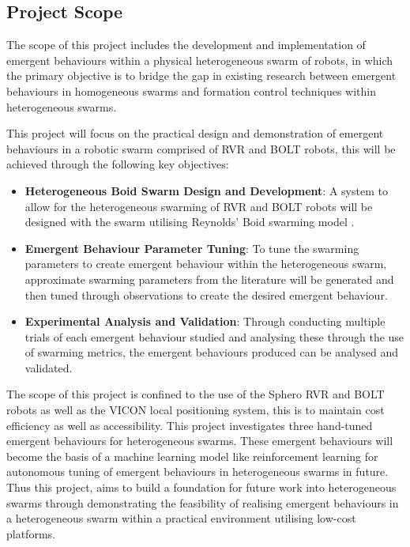 \documentclass[conference]{IEEEtran}
\begin{document}
\subsection{Project Scope}

The scope of this project includes the development and implementation of emergent behaviours within a physical heterogeneous swarm of robots, in which the primary objective is to bridge the gap in existing research between emergent behaviours in homogeneous swarms and formation control techniques within heterogeneous swarms. 

This project will focus on the practical design and demonstration of emergent behaviours in a robotic swarm comprised of RVR and BOLT robots, this will be achieved through the following key objectives:

\begin{itemize}
    \item \textbf{Heterogeneous Boid Swarm Design and Development}: A system to allow for the heterogeneous swarming of RVR and BOLT robots will be designed with the swarm utilising Reynolds' Boid swarming model \cite{reynolds_flocks_1987}.
    \item \textbf{Emergent Behaviour Parameter Tuning}: To tune the swarming parameters to create emergent behaviour within the heterogeneous swarm, approximate swarming parameters from the literature will be generated and then tuned through observations to create the desired emergent behaviour. 
    \item \textbf{Experimental Analysis and Validation}: Through conducting multiple trials of each emergent behaviour studied and analysing these through the use of swarming metrics, the emergent behaviours produced can be analysed and validated.
\end{itemize}


The scope of this project is confined to the use of the Sphero RVR and BOLT robots as well as the VICON local positioning system, this is to maintain cost efficiency as well as accessibility. This project investigates three hand-tuned emergent behaviours for heterogeneous swarms. These emergent behaviours will become the basis of a machine learning model like reinforcement learning for autonomous tuning of emergent behaviours in heterogeneous swarms in future. Thus this project, aims to build a foundation for future work into heterogeneous swarms through demonstrating the feasibility of realising emergent behaviours in a heterogeneous swarm within a practical environment utilising low-cost platforms.
\end{document}
